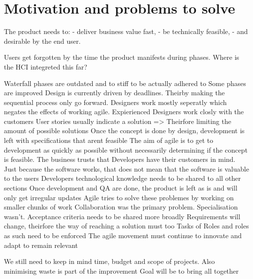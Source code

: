 \section*{Motivation and problems to solve}
The product needs to:
- deliver business value fast, 
- be technically feasible,
- and desirable by the end user.

Users get forgotten by the time the product manifests during phases.
Where is the HCI integreted this far?

Waterfall phases are outdated and to stiff to be actually adhered to
Some phases are improved
Design is currently driven by deadlines. Theirby making the sequential process only go forward.
Designers work mostly seperatly which negates the effects of working agile.
Expierienced Designers work closly with the customers
User stories usually indicate a solution => Theirfore limiting the amount of possible solutions
Once the concept is done by design, development is left with specifications that arent feasible
The aim of agile is to get to development as quickly as possible 
without necessarily determining if the concept is feasible.
The business trusts that Developers have their customers in mind. 
Just because the software works, that does not mean that the software is valuable to the users
Developers technological knowledge needs to be shared to all other sections
Once development and QA are done, the product is left as is and will only get irregular updates
Agile tries to solve these problemes by working on smaller chunks of work 
Collaboration was the primary problem. Specialisation wasn't.
Acceptance criteria needs to be shared more broadly
Requirements will change, theirfore the way of reaching a solution must too
Tasks of Roles and roles as such need to be enforced
The agile movement must continue to innovate and adapt to remain relevant

We still need to keep in mind time, budget and scope of projects. 
Also minimising waste is part of the improvement
Goal will be to bring all together


